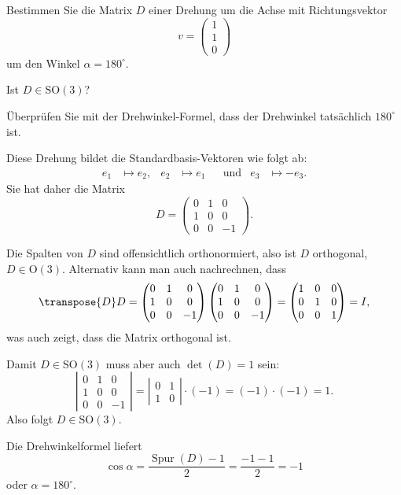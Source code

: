 Bestimmen Sie die Matrix $D$ einer Drehung um die Achse mit Richtungsvektor
\[
v=\begin{pmatrix}1\\1\\0\end{pmatrix}
\]
um den Winkel $\alpha=180^\circ$.
\begin{teilaufgaben}
\item Ist $D\in\text{SO}(3)$?
\item Überprüfen Sie mit der Drehwinkel-Formel, dass der Drehwinkel
tatsächlich $180^\circ$ ist.
\end{teilaufgaben}


\begin{loesung}
Diese Drehung bildet die Standardbasis-Vektoren wie folgt ab:
\[
\begin{aligned}
e_1&\mapsto e_2,
&
e_2&\mapsto e_1
&&\text{und}
&
e_3&\mapsto -e_3.
\end{aligned}
\]
Sie hat daher die Matrix
\[
D
=
\begin{pmatrix}
0&1& 0\\
1&0& 0\\
0&0&-1
\end{pmatrix}.
\]
\begin{teilaufgaben}
\item Die Spalten von $D$ sind offensichtlich orthonormiert, also ist $D$
orthogonal, $D\in\textrm{O}(3)$.
Alternativ kann man auch nachrechnen, dass
\[
\transpose{D}D
=
\begin{pmatrix}
0&1& 0\\
1&0& 0\\
0&0&-1
\end{pmatrix}
\begin{pmatrix}
0&1& 0\\
1&0& 0\\
0&0&-1
\end{pmatrix}
=
\begin{pmatrix}
1&0&0\\
0&1&0\\
0&0&1
\end{pmatrix}
=I,
\]
was auch zeigt, dass die Matrix orthogonal ist.

Damit $D\in\textrm{SO}(3)$ muss aber auch $\det(D)=1$ sein:
\[
\left|
\begin{matrix}
0&1& 0\\
1&0& 0\\
0&0&-1
\end{matrix}\right|
=
\left|\begin{matrix}0&1\\1&0\end{matrix}\right|\cdot (-1)
=(-1)\cdot(-1)=1.
\]
Also folgt $D\in\textrm{SO}(3)$.
\item
Die Drehwinkelformel liefert
\[
\cos\alpha = \frac{\operatorname{Spur}(D)-1}2=\frac{-1-1}2=-1
\]
oder $\alpha=180^\circ$.
\qedhere
\end{teilaufgaben}
\end{loesung}

